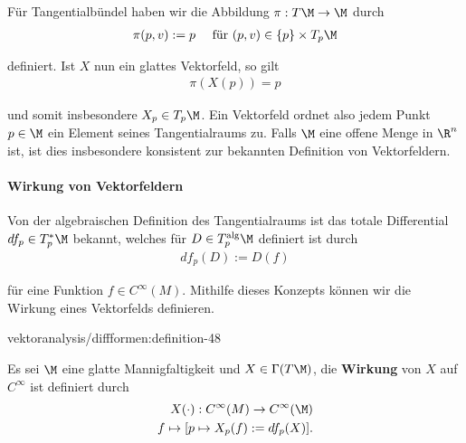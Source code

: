 \documentclass[letterpaper,10pt,english]{jupyterBook}
\begin{document}
\par
Für Tangentialbündel haben wir die Abbildung \(\pi:T\M\to\M\) durch
\begin{align*}
\pi(p,v):= p\quad\text{ für } (p,v)\in\{p\}\times T_p\M
\end{align*}
\par
definiert. Ist \(X\) nun ein glattes Vektorfeld, so gilt
\begin{align*}
\pi(X(p)) = p
\end{align*}
\par
und somit insbesondere \(X_p\in T_p\M\). Ein Vektorfeld ordnet also jedem Punkt \(p\in\M\) ein Element seines Tangentialraums zu. Falls \(\M\) eine offene Menge in \(\R^n\) ist, ist dies insbesondere konsistent zur bekannten Definition von Vektorfeldern.


\paragraph{Wirkung von Vektorfeldern}
\label{\detokenize{vektoranalysis/diffformen:wirkung-von-vektorfeldern}}
\par
Von der algebraischen Definition des Tangentialraums ist das totale Differential \(df_p\in T^\ast_p\M\) bekannt, welches für \(D\in T^{\text{alg}}_p\M\) definiert ist durch
\begin{align*}
df_p(D):= D(f)
\end{align*}
\par
für eine Funktion \(f\in C^\infty(M)\). Mithilfe dieses Konzepts können wir die Wirkung eines Vektorfelds definieren.
\begin{definition}{}{vektoranalysis/diffformen:definition-48}



\par
Es sei \(\M\) eine glatte Mannigfaltigkeit und \(X\in\Gamma(T\M)\), die \textbf{Wirkung} von \(X\) auf \(C^\infty\) ist definiert durch
\begin{align*}
X(\cdot):C^\infty(M)\to C^\infty(\M)\\
f\mapsto [p\mapsto X_p(f) := df_p(X)].
\end{align*}\end{definition}
\end{document}

